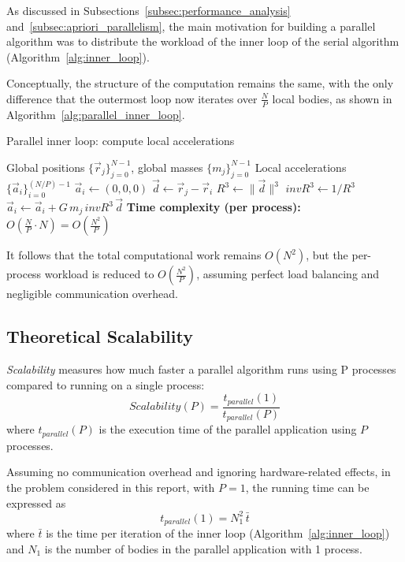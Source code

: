 \documentclass{article}
\begin{document}
As discussed in Subsections~\ref{subsec:performance_analysis} and~\ref{subsec:apriori_parallelism}, 
the main motivation for building a parallel algorithm was to distribute the workload of the inner loop 
of the serial algorithm (Algorithm~\ref{alg:inner_loop}).

Conceptually, the structure of the computation remains the same, with the only difference that 
the outermost loop now iterates over $\frac{N}{P}$ local bodies, as shown in 
Algorithm~\ref{alg:parallel_inner_loop}.


\begin{algorithm}[H]
\caption{Parallel inner loop: compute local accelerations}
\label{alg:parallel_inner_loop}
\begin{algorithmic}[1]
\Require Global positions $\{\vec r_j\}_{j=0}^{N-1}$, global masses $\{m_j\}_{j=0}^{N-1}$
\Ensure Local accelerations $\{\vec a_i\}_{i=0}^{(N/P)-1}$
  \State $\vec a_i \gets (0,0,0)$
      \State $\vec d \gets \vec r_j - \vec r_i$
      \State $R^3 \gets \|\vec d\|^3$
      \State $invR^3 \gets 1 / R^3$
      \State $\vec a_i \gets \vec a_i + G \, m_j \, invR^3 \, \vec d$
    \EndIf
  \EndFor
\EndFor
\Statex \textbf{Time complexity (per process):} $O\!\left(\frac{N}{P} \cdot N\right) = O\!\left(\frac{N^2}{P}\right)$
\end{algorithmic}
\end{algorithm}

It follows that the total computational work remains $O(N^2)$, but the per-process 
workload is reduced to $O\!\left(\frac{N^2}{P}\right)$, assuming perfect load balancing 
and negligible communication overhead.

\subsection{Theoretical Scalability}
\label{subsec:theoretical_scalability}
\emph{Scalability} measures how much faster a parallel algorithm runs using P processes compared to running on a single process:
\begin{equation}
Scalability(P) = \frac{t_{parallel}(1)}{t_{parallel}(P)}
\label{eq:scalability}
\end{equation}
where $t_{parallel}(P)$ is the execution time of the parallel application using $P$ processes.


Assuming no communication overhead and ignoring hardware-related effects, in the problem considered in this report, with $P = 1$, the running time can be expressed as
\begin{equation}
t_{{parallel}}(1) = N_1^2 \, \bar{t}
\end{equation}
where $\bar{t}$ is the time per iteration of the inner loop (Algorithm~\ref{alg:inner_loop}) and $N_1$ is the number of bodies in the parallel application with 1 process.
\end{document}
